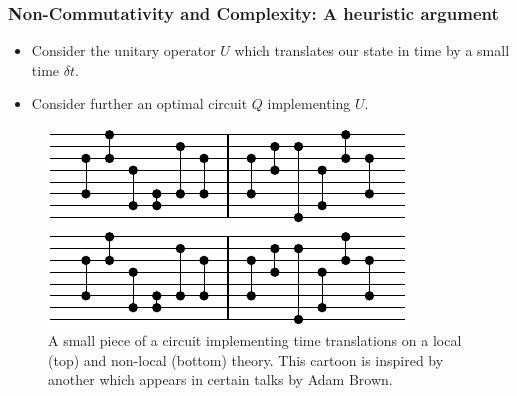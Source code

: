 \documentclass[8pt,aspectratio=169]{beamer}
\begin{document}
\begin{frame}
\frametitle{Non-Commutativity and Complexity: A heuristic argument}

\begin{minipage}[t]{0.5\linewidth}

\begin{itemize}

\item Consider the unitary operator $U$ which translates our state in time by a small time $\delta t$. 

\item Consider further an optimal circuit $Q$ implementing $U$.

\end{itemize}

\end{minipage}\hfill
%
\begin{minipage}[t]{0.48\linewidth}

\begin{figure}
    \begin{center}
    
        \includegraphics[scale=1]{animation/animation_1}    
        
        \vspace{2mm}
        
        \includegraphics[scale=1]{animation/animation_1}    
    
    \end{center}
    \caption{A small piece of a circuit implementing time translations on a local (top) and non-local (bottom) theory. This cartoon is inspired by another which appears in certain talks by Adam Brown.}
\end{figure}

\end{minipage}

\end{frame}
\end{document}
